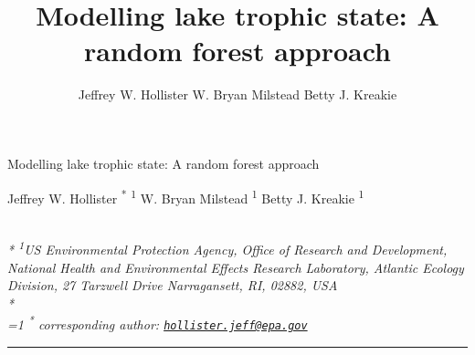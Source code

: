\documentclass[12pt,]{article}
\title{Modelling lake trophic state: A random forest approach}
\author{
Jeffrey W. Hollister
W. Bryan Milstead
Betty J. Kreakie
}
\date{}
\begin{document}
\begin{singlespace}
\begin{center}
\huge Modelling lake trophic state: A random forest approach
\end{center}
\begin{center}
\large
Jeffrey W. Hollister \textsuperscript{*} \textsuperscript{1} 
W. Bryan Milstead \textsuperscript{1} 
Betty J. Kreakie \textsuperscript{1} 
\end{center}
\begin{justify}
\footnotesize \emph{ 
\\*
\textsuperscript{1}US Environmental Protection Agency, Office of Research and Development,
National Health and Environmental Effects Research Laboratory, Atlantic
Ecology Division, 27 Tarzwell Drive Narragansett, RI, 02882, USA\\*
}
\setcounter{num}{1}
\\[0.1cm]
\footnotesize \emph{ 
\ifnum\value{num}=1%
\textsuperscript{*} corresponding author:
\fi
\href{mailto:hollister.jeff@epa.gov}{\nolinkurl{hollister.jeff@epa.gov}}
}
\end{justify}
\normalsize

\end{singlespace}


\singlespace

\vspace{2mm}

\hrule
\end{document}
